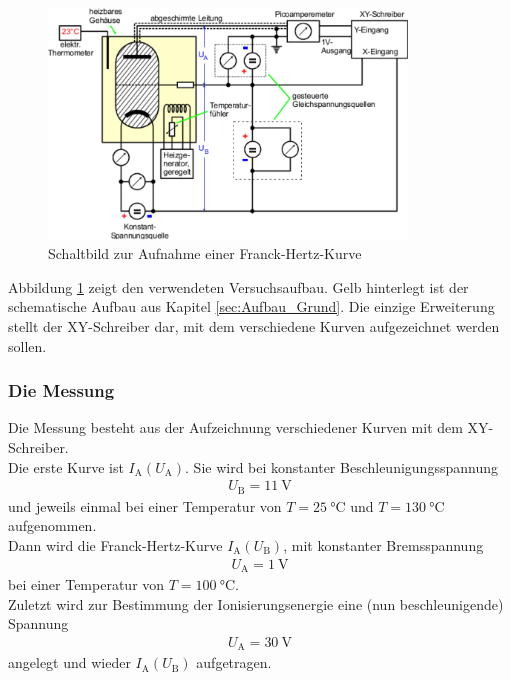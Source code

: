 \begin{figure}[h!]
	\centering
	\includegraphics[width = 0.85\textwidth]{Aufbau_Schaltbild.pdf}
	\caption{Schaltbild zur Aufnahme einer Franck-Hertz-Kurve}
	\label{fig:Schaltbild}
\end{figure}


Abbildung \ref{fig:Schaltbild} zeigt den verwendeten Versuchsaufbau. Gelb hinterlegt ist der schematische Aufbau aus Kapitel \ref{sec:Aufbau_Grund}. Die einzige Erweiterung stellt der XY-Schreiber dar, mit dem verschiedene Kurven aufgezeichnet werden sollen.
\subsubsection*{Die Messung}
Die Messung besteht aus der Aufzeichnung verschiedener Kurven mit dem XY-Schreiber. \\
Die erste Kurve ist $I_\text{A}(U_\text{A})$. Sie wird bei konstanter Beschleunigungsspannung
\begin{align}
	U_\text{B} = \SI{11}{\volt}
\end{align}
und jeweils einmal bei einer Temperatur von $T=\SI{25}{\celsius}$ und $T=\SI{130}{\celsius}$ aufgenommen. \\
Dann wird die Franck-Hertz-Kurve $I_\text{A}(U_\text{B})$, mit konstanter Bremsspannung
\begin{align}
	U_\text{A} = \SI{1}{\volt}
\end{align}
bei einer Temperatur von $T = \SI{100}{\celsius}$. \\
Zuletzt wird zur Bestimmung der Ionisierungsenergie eine (nun beschleunigende) Spannung
\begin{align}
	U_\text{A} = \SI{30}{\volt}
\end{align}
angelegt und wieder $I_\text{A}(U_\text{B})$ aufgetragen.